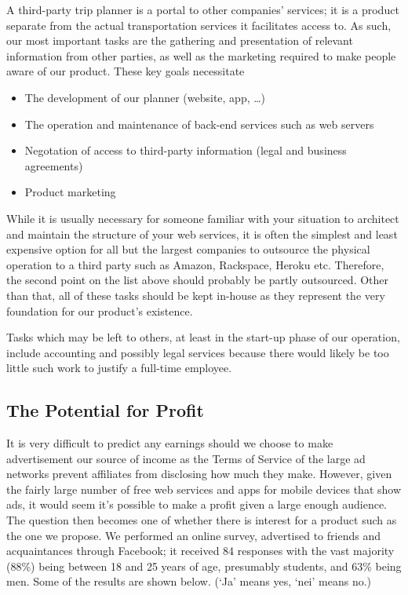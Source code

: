 A third-party trip planner is a portal to other companies' services; it is a
product separate from the actual transportation services it facilitates access
to. As such, our most important tasks are the gathering and presentation of
relevant information from other parties, as well as the marketing required to
make people aware of our product. These key goals necessitate

\begin{itemize}
    \item The development of our planner (website, app, \ldots)
    \item The operation and maintenance of back-end services such as web servers
    \item Negotation of access to third-party information (legal and business
          agreements)
    \item Product marketing
\end{itemize}

While it is usually necessary for someone familiar with your situation to
architect and maintain the structure of your web services, it is often the
simplest and least expensive option for all but the largest companies to
outsource the physical operation to a third party such as Amazon, Rackspace,
Heroku etc. Therefore, the second point on the list above should probably be
partly outsourced. Other than that, all of these tasks should be kept in-house
as they represent the very foundation for our product's existence.

Tasks which may be left to others, at least in the start-up phase of our
operation, include accounting and possibly legal services because there would
likely be too little such work to justify a full-time employee.

\subsection{The Potential for Profit}

It is very difficult to predict any earnings should we choose to make
advertisement our source of income as the Terms of Service of the large ad
networks prevent affiliates from disclosing how much they make. However, given
the fairly large number of free web services and apps for mobile devices that
show ads, it would seem it's possible to make a profit given a large enough
audience. The question then becomes one of whether there is interest for a
product such as the one we propose. We performed an online survey, advertised
to friends and acquaintances through Facebook; it received 84 responses with
the vast majority (88\%) being between 18 and 25 years of age, presumably
students, and 63\% being men. Some of the results are shown below. (`Ja' means
yes, `nei' means no.)

